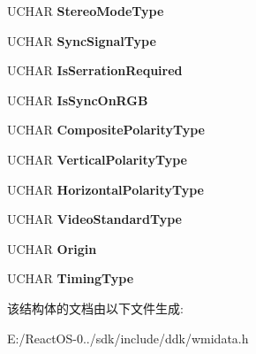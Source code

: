 \begin{DoxyCompactItemize}
\item 
\mbox{\label{struct___video_mode_descriptor_a37975d6bec33bd43f8d5f93ca4cb07d6}} 
U\+C\+H\+AR {\bfseries Stereo\+Mode\+Type}
\item 
\mbox{\label{struct___video_mode_descriptor_a226368f0535c8a4275e71defaca8da17}} 
U\+C\+H\+AR {\bfseries Sync\+Signal\+Type}
\item 
\mbox{\label{struct___video_mode_descriptor_a50af89e90b668c4b1f889a34f9e01921}} 
U\+C\+H\+AR {\bfseries Is\+Serration\+Required}
\item 
\mbox{\label{struct___video_mode_descriptor_ac53e0e03ad08c9a18db486ea019c7351}} 
U\+C\+H\+AR {\bfseries Is\+Sync\+On\+R\+GB}
\item 
\mbox{\label{struct___video_mode_descriptor_a0621545eff4d484f4fb722032e8a5b27}} 
U\+C\+H\+AR {\bfseries Composite\+Polarity\+Type}
\item 
\mbox{\label{struct___video_mode_descriptor_a91724ffa2510811e60f69a20f0cb279c}} 
U\+C\+H\+AR {\bfseries Vertical\+Polarity\+Type}
\item 
\mbox{\label{struct___video_mode_descriptor_a59ce4ff1320753f413ef4a37556c475d}} 
U\+C\+H\+AR {\bfseries Horizontal\+Polarity\+Type}
\item 
\mbox{\label{struct___video_mode_descriptor_acb95d7288eaef3ddfba4010df485c47c}} 
U\+C\+H\+AR {\bfseries Video\+Standard\+Type}
\item 
\mbox{\label{struct___video_mode_descriptor_a3f3fe171d6b3a7733c18caa583b526e4}} 
U\+C\+H\+AR {\bfseries Origin}
\item 
\mbox{\label{struct___video_mode_descriptor_afc21d44ee07978b1a0b9f065eecc29f6}} 
U\+C\+H\+AR {\bfseries Timing\+Type}
\end{DoxyCompactItemize}


该结构体的文档由以下文件生成\+:\begin{DoxyCompactItemize}
\item 
E\+:/\+React\+O\+S-\/0../sdk/include/ddk/wmidata.\+h\end{DoxyCompactItemize}
